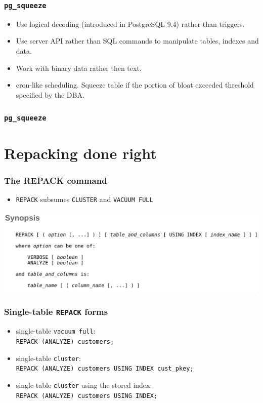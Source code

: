\begin{frame}
  \frametitle{\texttt{pg\_squeeze}}
  \begin{itemize}
    \item Use logical decoding (introduced in PostgreSQL 9.4) rather than
      triggers.
    \item Use server API rather than SQL commands to manipulate tables,
      indexes and data.
    \item Work with binary data rather then text.
    \item cron-like scheduling. Squeeze table if the portion of bloat exceeded
      threshold specified by the DBA.
  \end{itemize}
\end{frame}

\begin{frame}
        \frametitle{\texttt{pg\_squeeze}}
\end{frame}

\section{Repacking done right}
\begin{frame}
  \frametitle{The REPACK command}
  \begin{itemize}
    \item \texttt{REPACK} subsumes \texttt{CLUSTER} and \texttt{VACUUM FULL}
  \end{itemize}
  \includegraphics[width=\textwidth]{repack.png}
\end{frame}

\begin{frame}
  \frametitle{Single-table \texttt{REPACK} forms}
  \begin{itemize}
    \item single-table \texttt{vacuum full}: \\
      \texttt{REPACK (ANALYZE) customers;}
    \item single-table \texttt{cluster}: \\
      \texttt{REPACK (ANALYZE) customers USING INDEX cust\_pkey;}
    \item single-table \texttt{cluster} using the stored index: \\
      \texttt{REPACK (ANALYZE) customers USING INDEX;}
  \end{itemize}
\end{frame}

